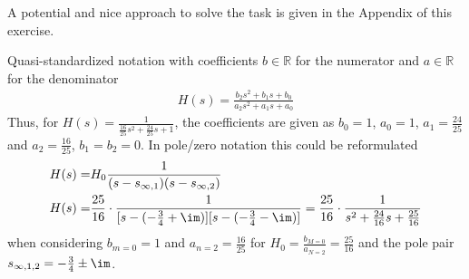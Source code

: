 \begin{Werkzeug}
A potential and nice approach to solve the task is given in the Appendix of this exercise.
\end{Werkzeug}
\begin{Ansatz}
Quasi-standardized notation with coefficients $b\in\mathbb{R}$ for the numerator and
$a\in\mathbb{R}$ for the denominator
\begin{align}
H(s) = \frac{b_2 s^2+b_1 s + b_0}{a_2 s^2+a_1 s +a_0}
\end{align}
Thus, for
$H(s) = \frac{1}{\frac{16}{25} s^2 + \frac{24}{25} s + 1}$,
the coefficients are given as
$b_0 = 1$, $a_0=1$, $a_1 = \frac{24}{25}$ and
$a_2 = \frac{16}{25}$, $b_1=b_2=0$.
%
In pole/zero notation this could be reformulated
\begin{align}
H(s) =& H_0 \frac{1}{(s-s_{\infty,1}) (s-s_{\infty,2})}\\
H(s) =& \frac{25}{16}\cdot\frac{1}{[s-(-\frac{3}{4}+\im)] [s-(-\frac{3}{4}-\im)]}
=
\frac{25}{16}\cdot\frac{1}{s^2 + \frac{24}{16} s  + \frac{25}{16}}
\end{align}
when considering $b_{m=0} = 1$ and $a_{n=2}=\frac{16}{25}$ for
$H_0 = \frac{b_{M=0}}{a_{N=2}}=\frac{25}{16}$ and the pole pair
$s_{\infty,1,2} = -\frac{3}{4} \pm \im$.
\end{Ansatz}

